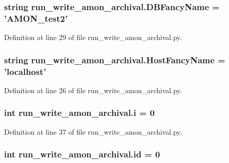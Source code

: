 \hypertarget{namespacerun__write__amon__archival_aa5de6eb45154aab7354efcde2d06c6f1}{
\subsubsection[{D\-B\-Fancy\-Name}]{\setlength{\rightskip}{0pt plus 5cm}string run\-\_\-write\-\_\-amon\-\_\-archival.\-D\-B\-Fancy\-Name = '{\bf A\-M\-O\-N\-\_\-test2}'}}\label{namespacerun__write__amon__archival_aa5de6eb45154aab7354efcde2d06c6f1}


Definition at line 29 of file run\-\_\-write\-\_\-amon\-\_\-archival.\-py.

\hypertarget{namespacerun__write__amon__archival_a418652887cb52c9b7abc4544caca7083}{
\subsubsection[{Host\-Fancy\-Name}]{\setlength{\rightskip}{0pt plus 5cm}string run\-\_\-write\-\_\-amon\-\_\-archival.\-Host\-Fancy\-Name = 'localhost'}}\label{namespacerun__write__amon__archival_a418652887cb52c9b7abc4544caca7083}


Definition at line 26 of file run\-\_\-write\-\_\-amon\-\_\-archival.\-py.

\hypertarget{namespacerun__write__amon__archival_a869ea157d829c6bcdc64d6292b1c3214}{
\subsubsection[{i}]{\setlength{\rightskip}{0pt plus 5cm}int run\-\_\-write\-\_\-amon\-\_\-archival.\-i = 0}}\label{namespacerun__write__amon__archival_a869ea157d829c6bcdc64d6292b1c3214}


Definition at line 37 of file run\-\_\-write\-\_\-amon\-\_\-archival.\-py.

\hypertarget{namespacerun__write__amon__archival_aaa5a8aad3154ef995c44531f8b1ff561}{
\subsubsection[{id}]{\setlength{\rightskip}{0pt plus 5cm}int run\-\_\-write\-\_\-amon\-\_\-archival.\-id = 0}}\label{namespacerun__write__amon__archival_aaa5a8aad3154ef995c44531f8b1ff561}


